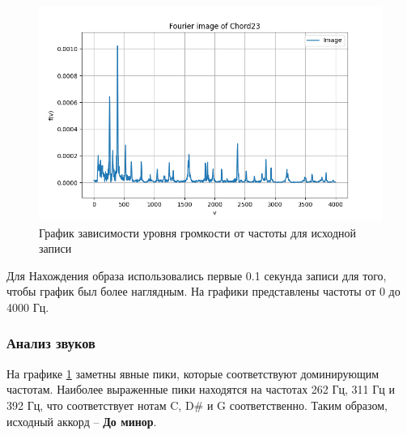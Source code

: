 \begin{figure}[ht!]
    \centering
    \includegraphics[width=\textwidth]{media/wave_image.png}
    \caption{График зависимости уровня громкости от частоты для исходной записи}
    \label{fig:wave_image}
\end{figure}

Для Нахождения образа использовались первые 0.1 секунда записи для того, чтобы график был более наглядным. На графики представлены частоты от 0 до 4000 Гц. 

\subsubsection{Анализ звуков}
На графике \ref{fig:wave_image} заметны явные пики, которые соответствуют доминирующим частотам. Наиболее выраженные пики находятся на частотах 262 Гц, 311 Гц и 392 Гц, что соответствует нотам C, D\# и G соответственно. Таким образом, исходный аккорд -- \textbf{До минор}. 